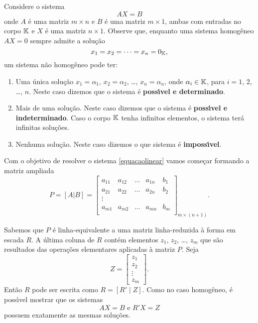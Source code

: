 Considere o sistema
\begin{equation}\label{equacaolinear}
AX = B
\end{equation}
onde $A$ \'e uma matriz $m \times n$ e $B$ \'e uma matriz $m \times 1$, ambas com entradas no corpo $\mathbb{K}$ e $X$ \'e uma matriz $n \times 1$. Observe que, enquanto uma sistema homog\^eneo $AX = 0$ sempre admite a solu\c{c}\~ao
\[
x_1 = x_2 = \cdots = x_n = 0_{\mathbb{K}},
\]
um sistema n\~ao homog\^eneo pode ter:
\begin{enumerate}
	\item Uma \'unica solu\c{c}\~ao $x_1 = \alpha_1$, $x_2 = \alpha_2$, \dots, $x_n = \alpha_n$, onde $\alpha_i \in \mathbb{K}$, para $i = 1$, 2, \dots, $n$. Neste caso dizemos que o sistema \'e \textbf{poss{\'\i}vel e determinado}.
	\item Mais de uma solu\c{c}\~ao. Neste caso dizemos que o sistema \'e \textbf{poss{\'\i}vel e indeterminado}. Caso o corpo $\mathbb{K}$ tenha infinitos elementos, o sistema ter\'a infinitas solu\c{c}\~oes.
	\item Nenhuma solu\c{c}\~ao. Neste caso dizemos o que sistema \'e \textbf{imposs{\'\i}vel}.
\end{enumerate}

Com o objetivo de resolver o sistema \eqref{equacaolinear} vamos come\c{c}ar formando a matriz ampliada
\[
P = [A|B] = \begin{bmatrix}
a_{11} & a_{12} & \dots & a_{1n} & b_1\\
a_{21} & a_{22} & \dots & a_{2n} & b_2\\
\vdots\\
a_{m1} & a_{m2} & \dots & a_{mn} & b_m\\
\end{bmatrix}_{m \times (n + 1)}.
\]

Sabemos que $P$ \'e linha-equivalente a uma matriz linha-reduzida \`a forma em escada $R$. A \'ultima coluna de $R$ cont\'em elementos $z_1$, $z_2$, \dots, $z_m$ que s\~ao resultados das opera\c{c}\~oes elementares aplicadas \`a matriz $P$. Seja 
\[
Z = \begin{bmatrix}
z_1\\
z_2\\
\vdots\\
z_m
\end{bmatrix}.
\]
Ent\~ao $R$ pode ser escrita como $R = [R' \mid Z]$. Como no caso homog\^eneo, \'e poss{\'\i}vel mostrar que os sistemas
\[
AX = B \mbox{ e } R'X = Z
\]
possuem exatamente as mesmas solu\c{c}\~oes.

